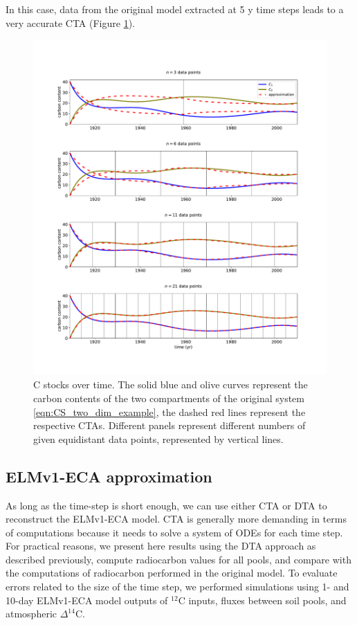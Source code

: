 \documentclass[draft]{agujournal2019}
\begin{document}
     In this case, data from the original model extracted at 5 y time steps leads to a very accurate CTA (Figure \ref{fig:CS_two_dim_example}).
    \begin{figure}[htbp]
        \centering 
        \includegraphics[width=1.0\linewidth]{figs/interpol_pwc_2.pdf}
        \caption{C stocks over time.
            The solid blue and olive curves represent the carbon contents of the two compartments of the original system \eqref{eqn:CS_two_dim_example}, the dashed red lines represent the respective CTAs. Different panels represent different numbers of given equidistant data points, represented by vertical lines.
            }
        \label{fig:CS_two_dim_example}
    \end{figure}        

\subsection{ELMv1-ECA approximation}
As long as the time-step is short enough, we can use either CTA or DTA to reconstruct the ELMv1-ECA model. CTA is generally more demanding in terms of computations because it needs to solve a system of ODEs for each time step. For practical reasons, we present here results using the DTA approach as described previously, compute radiocarbon values for all pools, and compare with the computations of radiocarbon performed in the original model. To evaluate errors related to the size of the time step, we performed simulations using 1- and 10-day ELMv1-ECA model outputs of $^{12}$C inputs, fluxes between soil pools, and atmospheric $\Delta^{14}$C. 
\end{document}
